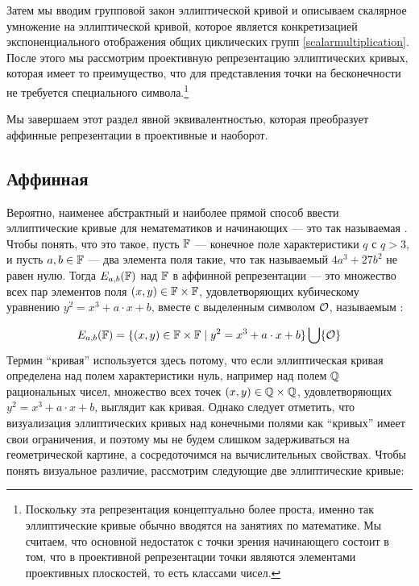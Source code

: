 Затем мы вводим групповой закон эллиптической кривой и описываем скалярное умножение на эллиптической кривой, которое является конкретизацией экспоненциального отображения общих циклических групп \ref{scalarmultiplication}. После этого мы рассмотрим проективную репрезентацию эллиптических кривых, которая имеет то преимущество, что для представления точки на бесконечности не требуется специального символа.\footnote{Поскольку эта репрезентация концептуально более проста, именно так эллиптические кривые обычно вводятся на занятиях по математике. Мы считаем, что основной недостаток с точки зрения начинающего состоит в том, что в проективной репрезентации точки являются элементами проективных плоскостей, то есть классами чисел.}

Мы завершаем этот раздел явной эквивалентностью, которая преобразует аффинные репрезентации в проективные и наоборот.

\subsection{Аффинная } Вероятно, наименее абстрактный и наиболее прямой способ ввести эллиптические кривые для нематематиков и начинающих — это так называемая  . Чтобы понять, что это такое, пусть $\mathbb{F}$ — конечное поле характеристики $q$ с $q>3$, и пусть $a,b\in \mathbb{F}$ — два элемента поля такие, что так называемый  $4a^3+ 27b^2$ не равен нулю. Тогда  $E_{a,b}(\mathbb{F})$ над $\mathbb{F}$ в аффинной репрезентации — это множество всех пар элементов поля $(x,y)\in \mathbb{F}\times \mathbb{F}$, удовлетворяющих кубическому уравнению  $y^2=x^3+a\cdot x+b$, вместе с выделенным символом $\mathcal{O}$, называемым :

\begin{equation}
\label{def_short_weierstrass_curve}
E_{a,b}(\mathbb{F}) = \{(x,y)\in \mathbb{F}\times \mathbb{F}\;|\; y^2=x^3+a\cdot x+b \} \bigcup \{\mathcal{O}\}
\end{equation}
Термин ``кривая'' используется здесь потому, что если эллиптическая кривая определена над полем характеристики нуль, например над полем $\mathbb{Q}$ рациональных чисел, множество всех точек $(x,y)\in \mathbb{Q}\times \mathbb{Q}$, удовлетворяющих $y^2 = x^3 +a\cdot x +b$, выглядит как кривая. Однако следует отметить, что визуализация эллиптических кривых над конечными полями как ``кривых'' имеет свои ограничения, и поэтому мы не будем слишком задерживаться на геометрической картине, а сосредоточимся на вычислительных свойствах. Чтобы понять визуальное различие, рассмотрим следующие две эллиптические кривые: 

